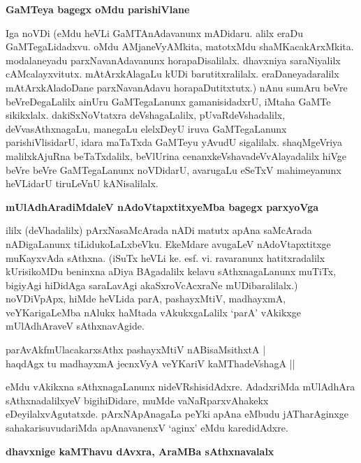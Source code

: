 {\bigskip
\noindent
{\large\bf GaMTeya bagegx oMdu parishiVlane}}\label{page170a}
\medskip

\noindent
Iga noVDi (eMdu heVLi GaMTAnAdavanunx mADidaru. alilx eraDu GaMTegaLidadxvu. oMdu AMjaneVyAMkita, matotxMdu shaMKacakArxMkita. modalaneyadu parxNavanAdavanunx horapaDisalilalx. dhavxniya saraNiyalilx cAMcalayxvitutx. mAtArxkAlagaLu kUDi barutitxralilalx. eraDaneyadaralilx mAtArxkAladoDane parxNavanAdavu horapaDutitxtutx.) nAnu sumAru beVre beVreDegaLalilx ainUru GaMTegaLanunx gamanisidadxrU, iMtaha GaMTe sikikxlalx. dakiSxNoVtatxra deVshagaLalilx, pUvaRdeVshadalilx, deVvasAthxnagaLu, manegaLu elelxDeyU iruva GaMTegaLanunx parishiVlisidarU, idara maTaTxda GaMTeyu yAvudU sigalilalx. shaqMgeVriya malilxkAjuRna beTaTxdalilx, beVlUrina cenanxkeVshavadeVvAlayadalilx hiVge beVre beVre GaMTegaLanunx noVDidarU, avarugaLu eSeTxV mahimeyanunx heVLidarU tiruLeVnU kANisalilalx.

\eject

{\bigskip
\noindent
{\large\bf mUlAdhAradiMdaleV nAdoVtapxtitxyeMba bagegx parxyoVga}}\label{page171}
\medskip

\noindent
ililx (deVhadalilx) pArxNasaMcArada nADi matutx apAna saMcArada nADigaLanunx tiLidukoLaLxbeVku. EkeMdare avugaLeV nAdoVtapxtitxge muKayxvAda sAthxna. (iSuTx heVLi ke. esf. vi. ravaranunx hatitxradalilx kUrisikoMDu beninxna aDiya BAgadalilx kelavu sAthxnagaLanunx muTiTx, bigiyAgi hiDidAga saraLavAgi akaSxroVcAcxraNe mUDibaralilalx.) noVDiVpApx, hiMde heVLida parA, pashayxMtiV, madhayxmA, veYKarigaLeMba nAlukx haMtada vAkukxgaLalilx `parA' vAkikxge mUlAdhAraveV sAthxnavAgide.

\begin{shloka}
parAvAkfmUlacakarxsAthx pashayxMtiV nABisaMsithxtA |\\\label{171}
haqdAgx tu madhayxmA jecnxVyA veYKariV kaMThadeVshagA ||
\end{shloka}

\noindent
eMdu vAkikxna sAthxnagaLanunx nideVRshisidAdxre. AdadxriMda mUlAdhAra sAthxnadalilxyeV bigihiDidare, muMde vaNaRparxvAhakekx eDeyilalxvAgutatxde. pArxNApAnagaLa peYki apAna eMbudu jATharAginxge sahakarisuvudariMda apAnavanenxV `aginx' eMdu karedidAdxre.

{\bigskip
\noindent
{\large\bf dhavxnige kaMThavu dAvxra, AraMBa sAthxnavalalx}}\label{page171a}
\medskip

